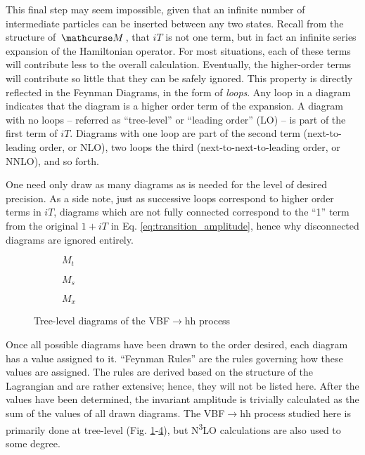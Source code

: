     This final step may seem impossible, given that an infinite number of intermediate particles can be inserted between any two states.
    Recall from the structure of $\invAmp$, that $iT$ is not one term, but in fact an infinite series expansion of the Hamiltonian operator.
    For most situations, each of these terms will contribute less to the overall calculation.
    Eventually, the higher-order terms will contribute so little that they can be safely ignored.
    This property is directly reflected in the Feynman Diagrams, in the form of \textit{loops}.
    Any loop in a diagram indicates that the diagram is a higher order term of the expansion.
    A diagram with no loops -- referred as ``tree-level'' or ``leading order'' (LO) -- is part of the first term of $iT$.
    Diagrams with one loop are part of the second term (next-to-leading order, or NLO),
        two loops the third (next-to-next-to-leading order, or NNLO), and so forth.

    One need only draw as many diagrams as is needed for the level of desired precision.
    As a side note, just as successive loops correspond to higher order terms in $iT$,
        diagrams which are not fully connected correspond to the ``1'' term from the original $1+iT$ in Eq. \ref{eq:transition_amplitude},
        hence why disconnected diagrams are ignored entirely.

    \begin{figure}
    \centering
    \begin{subfigure}[$M_t$]{0.32\textwidth} 
         
        \caption{$M_t$}
        \label{fig:tree_level_vbfhh:kv}
    \end{subfigure}
    \begin{subfigure}{0.32\textwidth}
         
        \caption{$M_s$}
        \label{fig:tree_level_vbfhh:kl}
    \end{subfigure}
    \begin{subfigure}{0.32\textwidth}
         
        \caption{$M_x$}
        \label{fig:tree_level_vbfhh:k2v}
    \end{subfigure}
    \caption{Tree-level diagrams of the VBF$\rightarrow$hh process}
    \end{figure}

    Once all possible diagrams have been drawn to the order desired, each diagram has a value assigned to it.
    ``Feynman Rules'' are the rules governing how these values are assigned.
    The rules are derived based on the structure of the Lagrangian and are rather extensive;
        hence, they will not be listed here.
    After the values have been determined, the invariant amplitude is trivially calculated as the sum of the values of all drawn diagrams.
    The VBF$\to$hh process studied here is primarily done at tree-level
        (Fig. \ref{fig:tree_level_vbfhh:kv}-\ref{fig:tree_level_vbfhh:k2v}),
        but N\textsuperscript{3}LO calculations are also used to some degree.

